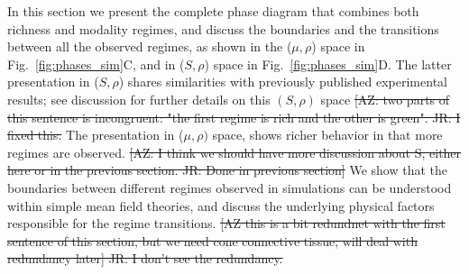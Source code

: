 \documentclass[9pt,twocolumn,twoside,lineno]{pnas-new}
\begin{document}
In this section we present the complete phase diagram that combines both richness and modality regimes, and discuss the boundaries and the transitions between all the observed regimes, as shown in the ($\mu,\rho$) space in Fig.~\ref{fig:phases_sim}C, and in ($S,\rho$) space in Fig.~\ref{fig:phases_sim}D. 
The latter presentation in ($S,\rho$) shares similarities with previously published experimental results; see discussion for further details on this $(S,\rho)$ space \st{[AZ: two parts of this sentence is incongruent: "the first regime is rich and the other is green". JR: I fixed this.}
The presentation in ($\mu,\rho)$ space, shows richer behavior in that more regimes are observed. 
\st{[AZ: I think we should have more discussion about S, either here or in the previous section. JR: Done in previous section]}
We show that the boundaries between different regimes observed in simulations can be understood within simple mean field theories, and discuss the underlying physical factors responsible for the regime transitions. \st{[AZ this is a bit redundnet with the first sentence  of this section, but we need cone connective tissue; will deal with redundancy later] JR: I don't see the redundancy.}
\end{document}
